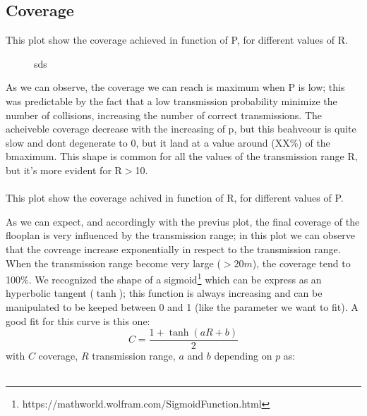 \subsection{Coverage}
This plot show the coverage achieved in function of P, for different values of R.
\begin{figure}[H]
    \begin{center}
    \end{center}
    \caption{sds}
\end{figure}
As we can observe, the coverage we can reach is maximum when P is low; this was predictable by the fact that a low transmission
probability minimize the number of collisions, increasing the number of correct transmissions. 
The acheiveble coverage decrease with the increasing of p, but this beahveour is quite slow and
dont degenerate to 0, but it land at a value around (XX\%) of the bmaximum. %
This shape is common for all the values of the transmission range R, but it's more evident for R$>$10.\\\\
This plot show the coverage achived in function of R, for different values of P.
\begin{figure}[H]
    \begin{center}
    \end{center}
\end{figure}
As we can expect, and accordingly with the previus plot, the final coverage of the flooplan is very
influenced by the transmission range; in this plot we can observe that the covreage increase exponentially
in respect to the transmission range. When the transmission range become very large ($>20m$),
the coverage tend to 100\%. We recognized the shape of a sigmoid\footnote{https://mathworld.wolfram.com/SigmoidFunction.html} 
which can be express as an hyperbolic tangent ($ \tanh $); this function is always increasing and can be manipulated
to be keeped between 0 and 1 (like the parameter we want to fit). A good fit for this curve is this one:\\
\begin{equation*}
    C =  \frac{1+\tanh(aR+b)}{2} 
\end{equation*} 
with $C$ coverage, $R$ transmission range, $a$ and $b$ depending on $p$ as:\\
\\
